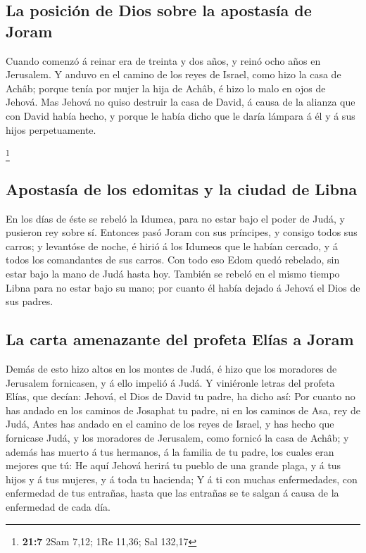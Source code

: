\hypertarget{la-posiciuxf3n-de-dios-sobre-la-apostasuxeda-de-joram}{%
\subsection{La posición de Dios sobre la apostasía de
Joram}\label{la-posiciuxf3n-de-dios-sobre-la-apostasuxeda-de-joram}}

 Cuando comenzó á reinar era de treinta y dos años, y reinó
ocho años en Jerusalem.  Y anduvo en el camino de los reyes
de Israel, como hizo la casa de Achâb; porque tenía por mujer la hija de
Achâb, é hizo lo malo en ojos de Jehová.  Mas Jehová no
quiso destruir la casa de David, á causa de la alianza que con David
había hecho, y porque le había dicho que le daría lámpara á él y á sus
hijos perpetuamente.

\footnote{\textbf{21:7} 2Sam 7,12; 1Re 11,36; Sal 132,17}

\hypertarget{apostasuxeda-de-los-edomitas-y-la-ciudad-de-libna}{%
\subsection{Apostasía de los edomitas y la ciudad de
Libna}\label{apostasuxeda-de-los-edomitas-y-la-ciudad-de-libna}}

 En los días de éste se rebeló la Idumea, para no estar bajo
el poder de Judá, y pusieron rey sobre sí.  Entonces pasó
Joram con sus príncipes, y consigo todos sus carros; y levantóse de
noche, é hirió á los Idumeos que le habían cercado, y á todos los
comandantes de sus carros.  Con todo eso Edom quedó
rebelado, sin estar bajo la mano de Judá hasta hoy. También se rebeló en
el mismo tiempo Libna para no estar bajo su mano; por cuanto él había
dejado á Jehová el Dios de sus padres.

\hypertarget{la-carta-amenazante-del-profeta-eluxedas-a-joram}{%
\subsection{La carta amenazante del profeta Elías a
Joram}\label{la-carta-amenazante-del-profeta-eluxedas-a-joram}}

 Demás de esto hizo altos en los montes de Judá, é hizo que
los moradores de Jerusalem fornicasen, y á ello impelió á Judá.
 Y viniéronle letras del profeta Elías, que decían: Jehová,
el Dios de David tu padre, ha dicho así: Por cuanto no has andado en los
caminos de Josaphat tu padre, ni en los caminos de Asa, rey de Judá,
 Antes has andado en el camino de los reyes de Israel, y
has hecho que fornicase Judá, y los moradores de Jerusalem, como fornicó
la casa de Achâb; y además has muerto á tus hermanos, á la familia de tu
padre, los cuales eran mejores que tú:  He aquí Jehová
herirá tu pueblo de una grande plaga, y á tus hijos y á tus mujeres, y á
toda tu hacienda;  Y á ti con muchas enfermedades, con
enfermedad de tus entrañas, hasta que las entrañas se te salgan á causa
de la enfermedad de cada día.

